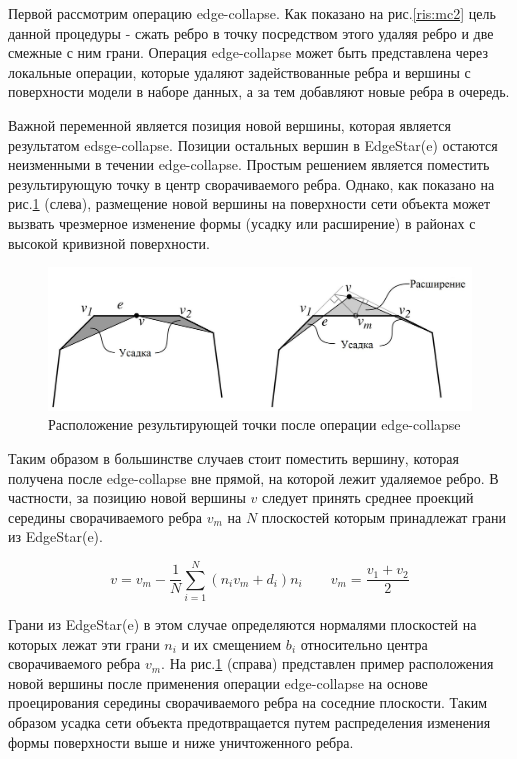 \documentclass[14pt]{article}
\numberwithin{figure}{section}
\numberwithin{equation}{section}
\begin{document}
Первой рассмотрим операцию edge-collapse. Как показано на рис.\ref{ris:mc2} цель данной процедуры - сжать ребро в точку посредством этого удаляя ребро и две смежные с ним грани. Операция edge-collapse может быть представлена через локальные операции, которые удаляют задействованные ребра и вершины с поверхности модели в наборе данных, а за тем добавляют новые ребра в очередь.

Важной переменной является позиция новой вершины, которая является результатом edsge-collapse. Позиции остальных вершин в EdgeStar(e) остаются неизменными в течении edge-collapse. Простым решением является поместить результирующую точку в центр сворачиваемого ребра. Однако, как показано на рис.\ref{ris:mc5} (слева), размещение новой вершины на поверхности сети объекта может вызвать чрезмерное изменение формы (усадку или расширение) в районах с высокой кривизной поверхности.

\begin{figure}
	\begin{center}
		\includegraphics[scale = 0.47]{mc5.JPG}
		\caption{Расположение результирующей точки после операции edge-collapse}
		\label{ris:mc5}
	\end{center}
\end{figure}

Таким образом в большинстве случаев стоит поместить вершину, которая получена после edge-collapse вне прямой, на которой лежит удаляемое ребро. В частности, за позицию новой вершины $v$ следует принять среднее проекций середины сворачиваемого ребра $v_m$ на $N$ плоскостей которым принадлежат грани из EdgeStar(e).

\begin{equation}
	v = v_m - \frac{1}{N} \sum\limits_{i = 1}^N (n_i v_m + d_i)n_i \qquad v_m = \frac{v_1 + v_2}{2}
\end{equation}

Грани из EdgeStar(e) в этом случае определяются нормалями плоскостей на которых лежат эти грани $n_i$ и их смещением $b_i$ относительно центра сворачиваемого ребра $v_m$. На рис.\ref{ris:mc5} (справа) представлен пример расположения новой вершины после применения операции edge-collapse на основе проецирования середины сворачиваемого ребра на соседние плоскости. Таким образом усадка сети объекта предотвращается путем распределения изменения формы поверхности выше и ниже уничтоженного ребра.
\end{document}
